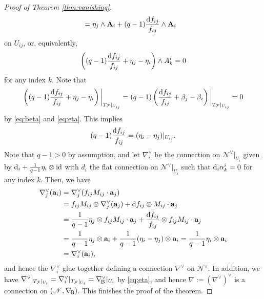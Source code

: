 \documentclass[english,10pt]{amsart}
\newcommand{\nablaBott}{\nabla_{\! \textup{B}}}
\newcommand{\cF}{\mathcal{F}}
\newcommand{\sN}{\mathscr{N}}
\newcommand{\dd}{\textup{d}}
\theoremstyle{definition}
\theoremstyle{remark}
\numberwithin{equation}{section}
\begin{document}
\begin{proof}[Proof of Theorem \ref{thm:vanishing}]
\begin{align*}
& =  \eta_j \wedge \textbf{A}_i + (q-1)\frac{\dd f_{ij}}{f_{ij}} \wedge \textbf{A}_i
\end{align*}
on $U_{ij}$, or, equivalently,
\begin{equation}\label{eq:almost_coboundary}
\left((q-1)\frac{\dd f_{ij}}{f_{ij}} +\eta_j-\eta_i\right)\wedge A_k^i=0
\end{equation}
for any index $k$. Note that
\[
\left((q-1)\frac{\dd f_{ij}}{f_{ij}} +\eta_j-\eta_i\right)\bigg|_{T_\cF|_{U_{ij}}}=
(q-1)\left(\frac{\dd f_{ij}}{f_{ij}} +\beta_j-\beta_i\right)\bigg|_{T_\cF|_{U_{ij}}}=0
\]
by \eqref{eq:beta} and \eqref{eq:eta}. This implies 
\[
(q-1)\frac{\dd f_{ij}}{f_{ij}} = (\eta_i - \eta_j)|_{U_{ij}}.
\]
Note that $q-1 > 0$ by assumption, and let $\nabla_i^\vee$ be the connection on $\sN^\vee|_{U_i}$ given by $\dd_i+\frac{1}{q-1}\eta_i\otimes \textup{id}$ with $d_i$ the flat connection on $\sN^\vee|_{U_i}$ such that $\dd_i \alpha_k^i=0$ for any index $k$. Then, we have
\begin{align*}
\nabla_j^\vee(\textbf{a}_i) & =\nabla_j^\vee(f_{ij} M_{ij} \cdot \textbf{a}_j)\\
& =f_{ij} M_{ij} \otimes \nabla_j^\vee(\textbf{a}_j)+\dd f_{ij} \otimes M_{ij}\cdot \textbf{a}_j \\ 
& = \frac{1}{q-1} \eta_j\otimes f_{ij} M_{ij} \cdot \textbf{a}_j+\frac{\dd f_{ij}}{f_{ij}}\otimes f_{ij} M_{ij}\cdot \textbf{a}_j\\
& =\frac{1}{q-1} \eta_j \otimes \textbf{a}_i+\frac{1}{q-1}(\eta_i-\eta_j)\otimes \textbf{a}_i=\frac{1}{q-1}\eta_i\otimes \textbf{a}_i\\
& =\nabla_i^\vee(\textbf{a}_i),
\end{align*}
and hence the $\nabla_i^\vee$ glue together defining a connection $\nabla^\vee$ on $\sN^\vee$. In addition, we have $\nabla^\vee|_{T_\cF|_{U_i}} = \nabla_i^\vee|_{T_\cF|_{U_i}} = \nablaBott^\vee|_{U_i}$ by \eqref{eq:eta}, and hence $\nabla:=(\nabla^\vee)^\vee$ is a connection on $(\sN,\nablaBott)$. This finishes the proof of the theorem.
\end{proof}
\end{document}
